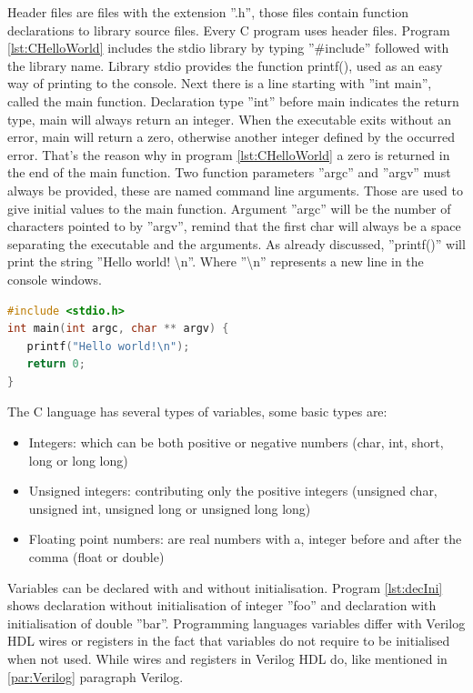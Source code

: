 \documentclass[12pt,a4paper,english,twoside,openright]{tutthesis}
\begin{document}
Header files are files with the extension ''.h'', those files contain function declarations to library source files. Every C program uses header files. Program \ref{lst:CHelloWorld} \cite{CLanguage} includes the stdio library by typing ''\#include'' followed with the library name. Library stdio provides the function printf(), used as an easy way of printing to the console. Next there is a line starting with ''int main'', called the main function. Declaration type ''int'' before main indicates the return type, main will always return an integer. When the executable exits without an error, main will return a zero, otherwise another integer defined by the occurred error. That's the reason why in program \ref{lst:CHelloWorld} a zero is returned in the end of the main function. Two function parameters ''argc'' and ''argv'' must always be provided, these are named command line arguments. Those are used to give initial values to the main function. Argument ''argc'' will be the number of characters pointed to by ''argv'', remind that the first char will always be a space separating the executable and the arguments. As already discussed, ''printf()'' will print the string ''Hello world! \textbackslash n''. Where ''\textbackslash n'' represents a new line in the console windows.
\centering
\begin{lstlisting}[caption={C Hello world! \cite{CLanguage}},label={lst:CHelloWorld},language=C, float=h]
#include <stdio.h>
int main(int argc, char ** argv) {
   printf("Hello world!\n");
   return 0;
}
\end{lstlisting}
The C language has several types of variables, some basic types are:
\begin{itemize}
	\item Integers:	which can be both positive or negative numbers (char, int, short, long or long long)
	\item Unsigned integers:	contributing only the positive integers (unsigned char, unsigned int, unsigned long or unsigned long long)
	\item Floating point numbers:	are real numbers with a, integer before and after the comma (float or double)
\end{itemize}
Variables can be declared with and without initialisation. Program \ref{lst:decIni} shows declaration without initialisation of integer ''foo'' and declaration with initialisation of double ''bar''. Programming languages variables differ with Verilog HDL wires or registers in the fact that variables do not require to be initialised when not used. While wires and registers in Verilog HDL do, like mentioned in \ref{par:Verilog} paragraph Verilog. 
\end{document}
